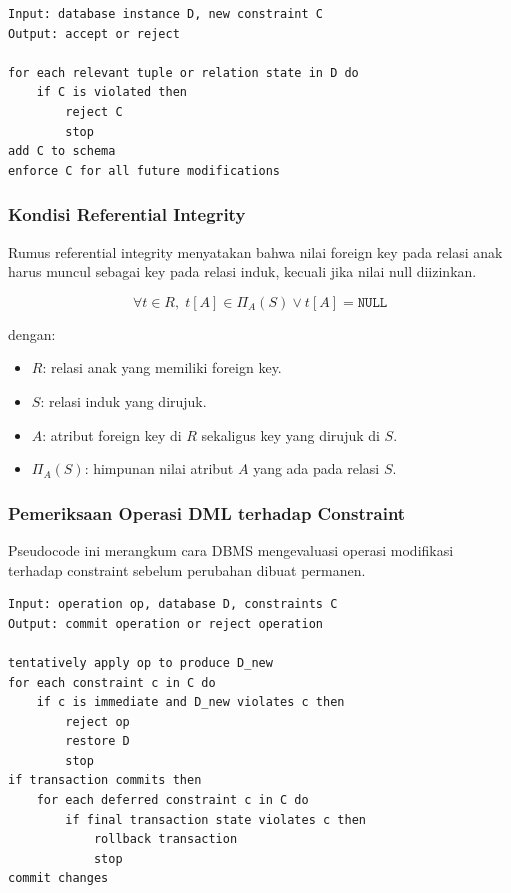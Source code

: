 \begin{lstlisting}[caption={Pseudocode validasi constraint baru}, label={lst:add-constraint-validation}]
Input: database instance D, new constraint C
Output: accept or reject

for each relevant tuple or relation state in D do
    if C is violated then
        reject C
        stop
add C to schema
enforce C for all future modifications
\end{lstlisting}

\subsubsection{Kondisi Referential Integrity}

\begin{jawab}
Rumus referential integrity menyatakan bahwa nilai foreign key pada relasi anak harus muncul sebagai key pada relasi induk, kecuali jika nilai null diizinkan.
\end{jawab}

\begin{equation}
    \forall t \in R,\; t[A] \in \Pi_A(S) \lor t[A] = \texttt{NULL}
    \label{eq:ri-final}
\end{equation}

dengan:
\begin{itemize}
    \item \(R\): relasi anak yang memiliki foreign key.
    \item \(S\): relasi induk yang dirujuk.
    \item \(A\): atribut foreign key di \(R\) sekaligus key yang dirujuk di \(S\).
    \item \(\Pi_A(S)\): himpunan nilai atribut \(A\) yang ada pada relasi \(S\).
\end{itemize}

\subsubsection{Pemeriksaan Operasi DML terhadap Constraint}

\begin{jawab}
Pseudocode ini merangkum cara DBMS mengevaluasi operasi modifikasi terhadap constraint sebelum perubahan dibuat permanen.
\end{jawab}

\begin{lstlisting}[caption={Pseudocode pemeriksaan DML terhadap constraint}, label={lst:dml-constraint-check}]
Input: operation op, database D, constraints C
Output: commit operation or reject operation

tentatively apply op to produce D_new
for each constraint c in C do
    if c is immediate and D_new violates c then
        reject op
        restore D
        stop
if transaction commits then
    for each deferred constraint c in C do
        if final transaction state violates c then
            rollback transaction
            stop
commit changes
\end{lstlisting}
